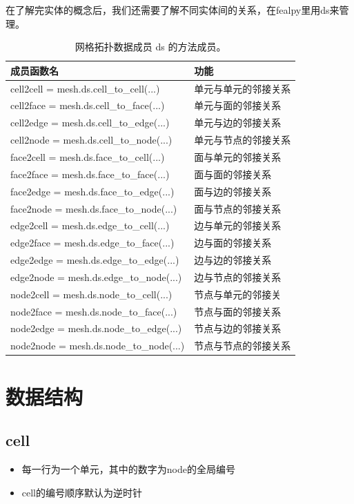 在了解完实体的概念后，我们还需要了解不同实体间的关系，在fealpy里用ds来管理。
\begin{table}[H]
	\centering
	\begin{tabular}{|l|l|}\hline
		成员函数名 & 功能\\\hline
		cell2cell = mesh.ds.cell\_to\_cell(...) &单元与单元的邻接关系\\\hline
		cell2face = mesh.ds.cell\_to\_face(...) &单元与面的邻接关系\\\hline
		cell2edge = mesh.ds.cell\_to\_edge(...) &单元与边的邻接关系\\\hline
		cell2node = mesh.ds.cell\_to\_node(...) &单元与节点的邻接关系\\\hline
		face2cell = mesh.ds.face\_to\_cell(...) &面与单元的邻接关系\\\hline
		face2face = mesh.ds.face\_to\_face(...) &面与面的邻接关系\\\hline
		face2edge = mesh.ds.face\_to\_edge(...) &面与边的邻接关系\\\hline
		face2node = mesh.ds.face\_to\_node(...) &面与节点的邻接关系\\\hline
		edge2cell = mesh.ds.edge\_to\_cell(...) &边与单元的邻接关系\\\hline
		edge2face = mesh.ds.edge\_to\_face(...) &边与面的邻接关系\\\hline
		edge2edge = mesh.ds.edge\_to\_edge(...) &边与边的邻接关系\\\hline
		edge2node = mesh.ds.edge\_to\_node(...) &边与节点的邻接关系\\\hline
		node2cell = mesh.ds.node\_to\_cell(...) &节点与单元的邻接关\\\hline
		node2face = mesh.ds.node\_to\_face(...) &节点与面的邻接关系\\\hline
		node2edge = mesh.ds.node\_to\_edge(...) &节点与边的邻接关系\\\hline
		node2node = mesh.ds.node\_to\_node(...) &节点与节点的邻接关系\\\hline
	\end{tabular}
	\caption{网格拓扑数据成员 ds 的方法成员。} 
\end{table}

\section{数据结构}
\subsection{cell}
\begin{itemize}
	\item 每一行为一个单元，其中的数字为node的全局编号
	\item cell的编号顺序默认为逆时针
\end{itemize}
